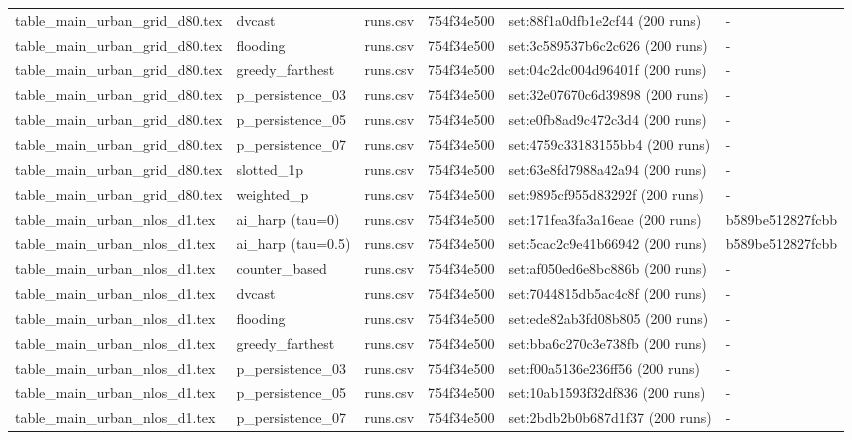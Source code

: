\begin{tabular}{llllll}
table\_main\_urban\_grid\_d80.tex & dvcast & runs.csv & 754f34e500 & set:88f1a0dfb1e2cf44 (200 runs) & - \\
table\_main\_urban\_grid\_d80.tex & flooding & runs.csv & 754f34e500 & set:3c589537b6c2c626 (200 runs) & - \\
table\_main\_urban\_grid\_d80.tex & greedy\_farthest & runs.csv & 754f34e500 & set:04c2dc004d96401f (200 runs) & - \\
table\_main\_urban\_grid\_d80.tex & p\_persistence\_03 & runs.csv & 754f34e500 & set:32e07670c6d39898 (200 runs) & - \\
table\_main\_urban\_grid\_d80.tex & p\_persistence\_05 & runs.csv & 754f34e500 & set:e0fb8ad9c472c3d4 (200 runs) & - \\
table\_main\_urban\_grid\_d80.tex & p\_persistence\_07 & runs.csv & 754f34e500 & set:4759c33183155bb4 (200 runs) & - \\
table\_main\_urban\_grid\_d80.tex & slotted\_1p & runs.csv & 754f34e500 & set:63e8fd7988a42a94 (200 runs) & - \\
table\_main\_urban\_grid\_d80.tex & weighted\_p & runs.csv & 754f34e500 & set:9895cf955d83292f (200 runs) & - \\
table\_main\_urban\_nlos\_d1.tex & ai\_harp (tau=0) & runs.csv & 754f34e500 & set:171fea3fa3a16eae (200 runs) & b589be512827fcbb \\
table\_main\_urban\_nlos\_d1.tex & ai\_harp (tau=0.5) & runs.csv & 754f34e500 & set:5cac2c9e41b66942 (200 runs) & b589be512827fcbb \\
table\_main\_urban\_nlos\_d1.tex & counter\_based & runs.csv & 754f34e500 & set:af050ed6e8bc886b (200 runs) & - \\
table\_main\_urban\_nlos\_d1.tex & dvcast & runs.csv & 754f34e500 & set:7044815db5ac4c8f (200 runs) & - \\
table\_main\_urban\_nlos\_d1.tex & flooding & runs.csv & 754f34e500 & set:ede82ab3fd08b805 (200 runs) & - \\
table\_main\_urban\_nlos\_d1.tex & greedy\_farthest & runs.csv & 754f34e500 & set:bba6c270c3e738fb (200 runs) & - \\
table\_main\_urban\_nlos\_d1.tex & p\_persistence\_03 & runs.csv & 754f34e500 & set:f00a5136e236ff56 (200 runs) & - \\
table\_main\_urban\_nlos\_d1.tex & p\_persistence\_05 & runs.csv & 754f34e500 & set:10ab1593f32df836 (200 runs) & - \\
table\_main\_urban\_nlos\_d1.tex & p\_persistence\_07 & runs.csv & 754f34e500 & set:2bdb2b0b687d1f37 (200 runs) & - \\

\end{tabular}
